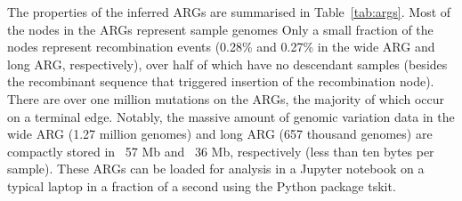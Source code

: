 \documentclass{article}
\begin{document}

The properties of the inferred ARGs are summarised in Table~\ref{tab:args}.
Most of the nodes in the ARGs represent sample genomes
Only a small fraction of the nodes represent recombination events (0.28\% and
0.27\% in the wide ARG and long ARG, respectively), over half of which have no
descendant samples (besides the recombinant sequence that triggered insertion
of the recombination node). There are over one million mutations on
the ARGs, the majority of which occur on a terminal edge. Notably,
the massive amount of genomic variation data in the wide ARG (1.27 million
genomes) and long ARG (657 thousand genomes) are compactly stored in ~57 Mb and
~36 Mb, respectively (less than ten bytes per sample). These ARGs can be loaded
for analysis in a Jupyter notebook on a typical laptop in a
fraction of a second using the Python package tskit.
\end{document}
